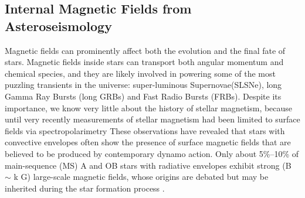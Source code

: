 \subsection{Internal Magnetic Fields from Asteroseismology}

Magnetic fields can prominently affect both the evolution and the final fate of stars. Magnetic fields inside stars can transport both angular momentum and chemical species, and they are likely involved in powering some of the most puzzling transients in the universe: super-luminous Supernovae(SLSNe), long Gamma Ray Bursts (long GRBs) and Fast Radio Bursts (FRBs). Despite its importance, we know very little about the history of stellar magnetism, because until very recently measurements of stellar magnetism had been limited to surface fields via spectropolarimetry
{\color{green} These observations have revealed that stars with convective envelopes often show the presence of surface magnetic fields that are believed to be produced by contemporary dynamo action. Only about 5\%–10\% of main-sequence (MS) A and OB stars with radiative envelopes exhibit strong (B $\sim$ k G) large-scale magnetic fields, whose origins are debated but may be inherited during the star formation process \citep[fossil fields, see e.g.,][]{2012ASPC..464..405W}.}
